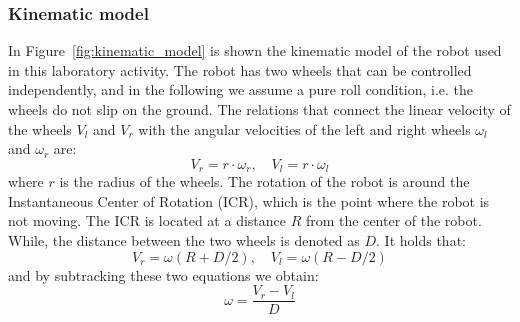 \subsubsection{Kinematic model}
In Figure~\ref{fig:kinematic_model} is shown the kinematic model of the robot used in this laboratory activity. 
The robot has two wheels that can be controlled independently, and in the following we assume a pure roll condition, i.e. the wheels do not slip on the ground.
The relations that connect the linear velocity of the wheels $V_l$ and $V_r$ with the angular velocities of the left and right wheels $\omega_l$ and $\omega_r$ are:
\begin{equation}
    V_r = r \cdot \omega_r, \quad V_l = r \cdot \omega_l
\end{equation}
where $r$ is the radius of the wheels.
The rotation of the robot is around the Instantaneous Center of Rotation (ICR), which is the point where the robot is not moving. The ICR is located at a distance $R$ from the center of the robot.
While, the distance between the two wheels is denoted as $D$. It holds that:
\begin{equation}
    V_r = \omega(R+D/2), \quad V_l = \omega(R-D/2)
\end{equation}
and by subtracking these two equations we obtain:
\begin{equation}
    \omega = \frac{V_r - V_l}{D}
\end{equation}

